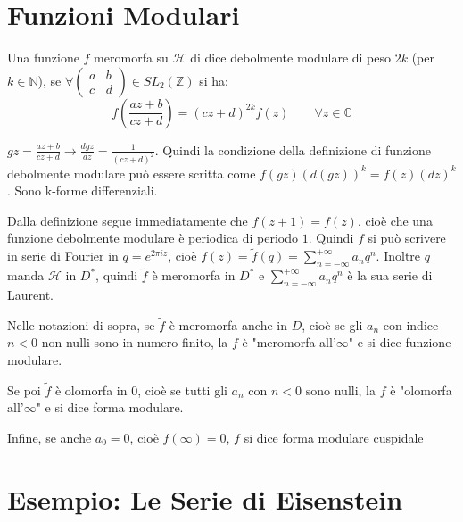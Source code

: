 \section{Funzioni Modulari}

\begin{definizione}
Una funzione $f$ meromorfa su $\mathcal{H}$ di dice debolmente modulare di peso $2k$ (per $k \in \mathbb{N}$), se $\forall
\left( \begin{array}{cc} a & b \\ c & d \end{array} \right) \in
SL_2 \left( \mathbb{Z} \right)$ si ha:
$$ f\left( \frac{az+b}{cz+d} \right) = (cz+d)^{2k} f(z)
\qquad \forall z \in \mathbb{C}$$
\end{definizione}

\begin{osservazione}
$\displaystyle{gz=\frac{az+b}{cz+d} \rightarrow
\frac{dgz}{dz}=\frac{1}{(cz+d)^2}}$. Quindi la condizione della definizione di
funzione debolmente modulare può essere scritta come $f(gz)(d(gz))^k=f(z)(dz)^k$.
Sono k-forme differenziali.
\end{osservazione}

\begin{osservazione}
Dalla definizione segue immediatamente che $f(z+1)=f(z)$, cioè che una
funzione debolmente modulare è periodica di periodo $1$. Quindi $f$ si può scrivere in serie di Fourier in $q=e^{2 \pi i z}$, cioè
$\displaystyle{f(z)=\widetilde{f}(q)=\sum^{+\infty}_{n=-\infty}{a_n q^n}}$.
Inoltre $q$ manda $\mathcal{H}$ in $D^*$, quindi $\widetilde{f}$ è meromorfa
in $D^*$ e $\displaystyle{\sum^{+\infty}_{n=-\infty}{a_n q^n}}$ è la sua
serie di Laurent.
\end{osservazione}

\begin{definizione}
Nelle notazioni di sopra, se $\widetilde{f}$ è meromorfa anche in $D$, cioè
se gli $a_n$ con indice $n<0$ non nulli sono in numero finito, la $f$
è "meromorfa all'$\infty$" e si dice funzione modulare.

Se poi $\widetilde{f}$ è olomorfa in $0$, cioè se tutti gli $a_n$ con $n<0$
sono nulli, la $f$ è "olomorfa all'$\infty$" e si dice forma modulare.

Infine, se anche $a_0=0$, cioè $f(\infty)=0$, $f$ si dice forma modulare
cuspidale
\end{definizione}

\section{Esempio: Le Serie di Eisenstein}

